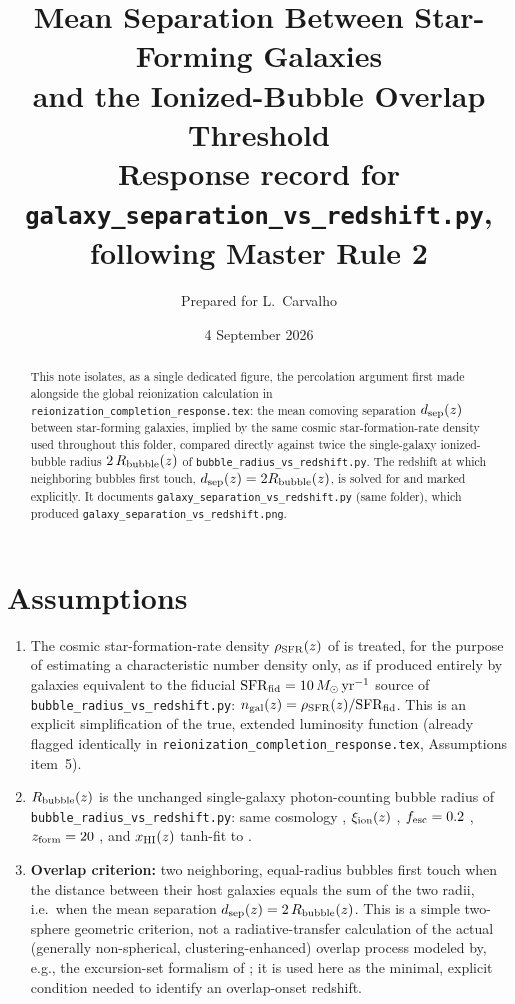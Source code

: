 \documentclass[11pt,a4paper]{article}
\title{\bf Mean Separation Between Star-Forming Galaxies\\ and the Ionized-Bubble Overlap Threshold\\[2mm]
\large Response record for \texttt{galaxy\_separation\_vs\_redshift.py}, following Master Rule 2}
\author{Prepared for L.\ Carvalho}
\date{4 September 2026}
\newcommand{\Msun}{\,M_\odot}
\begin{document}
\maketitle

\begin{abstract}
\noindent
This note isolates, as a single dedicated figure, the percolation argument first made alongside the global
reionization calculation in \texttt{reionization\_completion\_response.tex}: the mean comoving separation
$d_{\rm sep}(z)$ between star-forming galaxies, implied by the same cosmic star-formation-rate density
\citep{MadauDickinson2014} used throughout this folder, compared directly against twice the single-galaxy
ionized-bubble radius $2\,R_{\rm bubble}(z)$ of \texttt{bubble\_radius\_vs\_redshift.py}. The redshift at
which neighboring bubbles first touch, $d_{\rm sep}(z)=2R_{\rm bubble}(z)$, is solved for and marked
explicitly. It documents \texttt{galaxy\_separation\_vs\_redshift.py} (same folder), which produced
\texttt{galaxy\_separation\_vs\_redshift.png}.
\end{abstract}

\tableofcontents

\section{Assumptions}
\label{sec:assumptions}

\begin{enumerate}
\item The cosmic star-formation-rate density $\rho_{\rm SFR}(z)$ of \citet{MadauDickinson2014} is treated,
      for the purpose of estimating a characteristic number density only, as if produced entirely by
      galaxies equivalent to the fiducial $\mathrm{SFR}_{\rm fid}=10\Msun\,{\rm yr^{-1}}$ source of
      \texttt{bubble\_radius\_vs\_redshift.py}: $n_{\rm gal}(z)=\rho_{\rm SFR}(z)/\mathrm{SFR}_{\rm fid}$. This
      is an explicit simplification of the true, extended luminosity function (already flagged identically
      in \texttt{reionization\_completion\_response.tex}, Assumptions item~5).
\item $R_{\rm bubble}(z)$ is the unchanged single-galaxy photon-counting bubble radius of
      \texttt{bubble\_radius\_vs\_redshift.py}: same cosmology \citep{Planck2018VI}, $\xi_{\rm ion}(z)$
      \citep{Llerena2024}, $f_{\rm esc}=0.2$ \citep{Robertson2015}, $z_{\rm form}=20$
      \citep{Kitayama2004}, and $x_{\rm HI}(z)$ tanh-fit to \citet{Umeda2023}.
\item \textbf{Overlap criterion:} two neighboring, equal-radius bubbles first touch when the distance between
      their host galaxies equals the sum of the two radii, i.e.\ when the mean separation
      $d_{\rm sep}(z) = 2\,R_{\rm bubble}(z)$. This is a simple two-sphere geometric criterion, not a
      radiative-transfer calculation of the actual (generally non-spherical, clustering-enhanced) overlap
      process modeled by, e.g., the excursion-set formalism of \citet{Furlanetto2004}; it is used here as the
      minimal, explicit condition needed to identify an overlap-onset redshift.
\end{enumerate}
\end{document}
